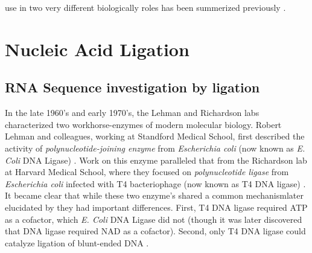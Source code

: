 \dscam{} use in two very different biologically roles has been summerized previously \citep{Hemani2012}. 



\section{Nucleic Acid Ligation}
\subsection{RNA Sequence investigation by ligation}\label{sec:Ligation}

In the late 1960's and early 1970's, the Lehman and Richardson labs characterized two workhorse-enzymes of modern molecular biology. Robert Lehman and colleagues, working at Standford Medical School, first described the activity of \textit{polynucleotide-joining enzyme} from \textit{Escherichia coli} (now known as \textit{E. Coli} DNA Ligase) \citep{Olivera1967b}. Work on this enzyme paralleled that from the Richardson lab at Harvard Medical School, where they focused on \textit{polynucleotide ligase} from \textit{Escherichia coli} infected with T4 bacteriophage (now known as T4 DNA ligase) \citep{Weiss1967a}. It became clear that while these two enzyme's shared a common mechanism\textemdash later elucidated by \citep{Modrich1973a}\textemdash they had important differences. First, T4 DNA ligase required ATP as a cofactor, which \textit{E. Coli} DNA Ligase did not (though it was later discovered that DNA ligase required NAD as a cofactor). Second, only T4 DNA ligase could catalyze ligation of blunt-ended DNA \citep{Tabor1987a}.

